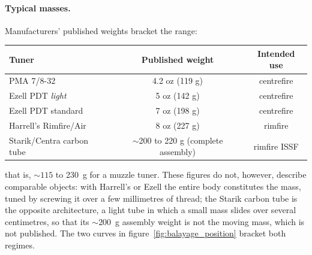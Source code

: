\documentclass[12pt,a4paper]{article}
\begin{document}
	\paragraph{Typical masses.} Manufacturers' published weights bracket the range:
	\begin{center}
	\begin{tabular}{lcc}
		\toprule
		Tuner & Published weight & Intended use \\
		\midrule
		PMA 7/8-32 & 4.2 oz (119 g) & centrefire \\
		Ezell PDT \emph{light} & 5 oz (142 g) & centrefire \\
		Ezell PDT standard & 7 oz (198 g) & centrefire \\
		Harrell's Rimfire/Air & 8 oz (227 g) & rimfire \\
		Starik/Centra carbon tube & $\sim$200 to 220 g (complete assembly) & rimfire ISSF \\
		\bottomrule
	\end{tabular}
	\end{center}
	that is, $\sim 115$ to 230~g for a muzzle tuner. These figures do not, however, describe comparable objects: with Harrell's or Ezell the entire body constitutes the mass, tuned by screwing it over a few millimetres of thread; the Starik carbon tube is the opposite architecture, a light tube in which a small mass slides over several centimetres, so that its $\sim 200$~g assembly weight is not the moving mass, which is not published. The two curves in figure~\ref{fig:balayage_position} bracket both regimes.
\end{document}
